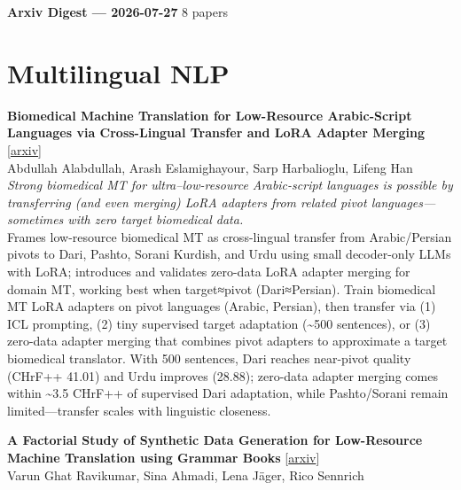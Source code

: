 \documentclass[12pt,letterpaper]{article}
\begin{document}
{\footnotesize\textbf{Arxiv Digest --- 2026-07-27} \hfill 8 papers}

\smallskip

\section*{Multilingual NLP}

{\small\textbf{Biomedical Machine Translation for Low-Resource Arabic-Script Languages via Cross-Lingual Transfer and LoRA Adapter Merging}} {\scriptsize[\href{https://arxiv.org/abs/2607.22300}{arxiv}]}\\
{\scriptsize Abdullah Alabdullah, Arash Eslamighayour, Sarp Harbalioglu, Lifeng Han}\\

{\small\textit{Strong biomedical MT for ultra--low-resource Arabic-script languages is possible by transferring (and even merging) LoRA adapters from related pivot languages---sometimes with zero target biomedical data.}}\\[1pt]
{\footnotesize Frames low-resource biomedical MT as cross-lingual transfer from Arabic/Persian pivots to Dari, Pashto, Sorani Kurdish, and Urdu using small decoder-only LLMs with LoRA; introduces and validates zero-data LoRA adapter merging for domain MT, working best when target≈pivot (Dari≈Persian). Train biomedical MT LoRA adapters on pivot languages (Arabic, Persian), then transfer via (1) ICL prompting, (2) tiny supervised target adaptation (\textasciitilde{}500 sentences), or (3) zero-data adapter merging that combines pivot adapters to approximate a target biomedical translator. With 500 sentences, Dari reaches near-pivot quality (CHrF++ 41.01) and Urdu improves (28.88); zero-data adapter merging comes within \textasciitilde{}3.5 CHrF++ of supervised Dari adaptation, while Pashto/Sorani remain limited---transfer scales with linguistic closeness.}

\medskip

{\small\textbf{A Factorial Study of Synthetic Data Generation for Low-Resource Machine Translation using Grammar Books}} {\scriptsize[\href{https://arxiv.org/abs/2607.22376}{arxiv}]}\\
{\scriptsize Varun Ghat Ravikumar, Sina Ahmadi, Lena J\"ager, Rico Sennrich}\\
\end{document}
